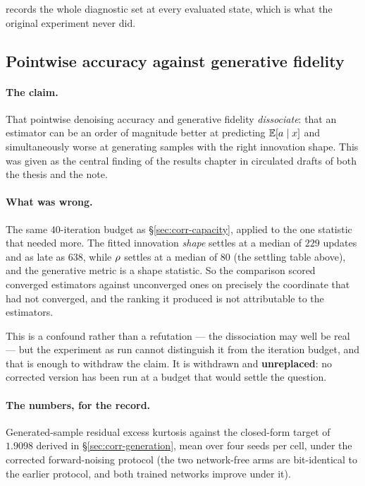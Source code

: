  records the whole diagnostic set at every
evaluated state, which is what the original experiment never did.

\subsection{Pointwise accuracy against generative fidelity}
\label{sec:corr-dissociation}

\paragraph{The claim.} That pointwise denoising accuracy and generative fidelity
\emph{dissociate}: that an estimator can be an order of magnitude better at predicting
$\mathbb{E}[a \mid x]$ and simultaneously worse at generating samples with the right innovation
shape. This was given as the central finding of the results chapter in circulated drafts of
both the thesis and the note.

\paragraph{What was wrong.} The same $40$-iteration budget as \S\ref{sec:corr-capacity},
applied to the one statistic that needed more. The fitted innovation \emph{shape} settles at a
median of $229$ updates and as late as $638$, while $\rho$ settles at a median of $80$
(the settling table above), and the generative metric is
a shape statistic. So the comparison scored converged estimators
against unconverged ones on precisely the coordinate that had not converged, and the ranking
it produced is not attributable to the estimators.

This is a confound rather than a refutation --- the dissociation may well be real --- but the
experiment as run cannot distinguish it from the iteration budget, and that is enough to
withdraw the claim. It is withdrawn and \textbf{unreplaced}: no corrected version has been
run at a budget that would settle the question.

\paragraph{The numbers, for the record.} Generated-sample residual excess kurtosis against
the closed-form target of $1.9098$ derived in \S\ref{sec:corr-generation}, mean over four
seeds per cell, under the corrected forward-noising protocol (the two network-free arms are
bit-identical to the earlier protocol, and both trained networks improve under it).

